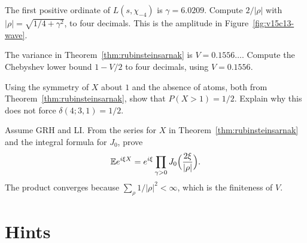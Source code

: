 \begin{exercise}[$\star$]\label{ex:v15-13-1}
The first positive ordinate of \(L(s,\chi_{-4})\) is \(\gamma=6.0209\). Compute \(2/|\rho|\) with \(|\rho|=\sqrt{1/4+\gamma^2}\), to four decimals. This is the amplitude in Figure~\ref{fig:v15c13-wave}.
\end{exercise}

\begin{exercise}[$\star$]\label{ex:v15-13-2}
The variance in Theorem~\ref{thm:rubinsteinsarnak} is \(V=0.1556\ldots\). Compute the Chebyshev lower bound \(1-V/2\) to four decimals, using \(V=0.1556\).
\end{exercise}

\begin{exercise}[$\star\star$]\label{ex:v15-13-3}
Using the symmetry of \(X\) about \(1\) and the absence of atoms, both from Theorem~\ref{thm:rubinsteinsarnak}, show that \(P(X>1)=1/2\). Explain why this does not force \(\delta(4;3,1)=1/2\).
\end{exercise}

\begin{exercise}[$\star\star\star$]\label{ex:v15-13-4}
Assume GRH and LI. From the series for \(X\) in Theorem~\ref{thm:rubinsteinsarnak} and the integral formula for \(J_0\), prove
\[
\mathbb Ee^{i\xi X}=e^{i\xi}\prod_{\gamma>0}J_0\Bigl(\frac{2\xi}{|\rho|}\Bigr).
\]
The product converges because \(\sum_\rho 1/|\rho|^2<\infty\), which is the finiteness of \(V\).
\end{exercise}

\section{Hints}

